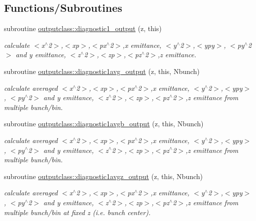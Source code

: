 \subsection*{Functions/\+Subroutines}
\begin{DoxyCompactItemize}
\item 
subroutine \mbox{\hyperlink{namespaceoutputclass_a3b5a43f1652254e5a12880dc332a48c3}{outputclass\+::diagnostic1\+\_\+output}} (z, this)
\begin{DoxyCompactList}\small\item\em calculate $<$x$^\wedge$2$>$,$<$xp$>$,$<$px$^\wedge$2$>$,x emittance, $<$y$^\wedge$2$>$,$<$ypy$>$, $<$py$^\wedge$2$>$ and y emittance, $<$z$^\wedge$2$>$,$<$zp$>$,$<$pz$^\wedge$2$>$,z emittance. \end{DoxyCompactList}\item 
subroutine \mbox{\hyperlink{namespaceoutputclass_ac91c3984014cb5cdc000c0422ccd08a1}{outputclass\+::diagnostic1avg\+\_\+output}} (z, this, Nbunch)
\begin{DoxyCompactList}\small\item\em calculate averaged $<$x$^\wedge$2$>$,$<$xp$>$,$<$px$^\wedge$2$>$,x emittance, $<$y$^\wedge$2$>$,$<$ypy$>$, $<$py$^\wedge$2$>$ and y emittance, $<$z$^\wedge$2$>$,$<$zp$>$,$<$pz$^\wedge$2$>$,z emittance from multiple bunch/bin. \end{DoxyCompactList}\item 
subroutine \mbox{\hyperlink{namespaceoutputclass_a42165712a4636aa78bacdd26efa4bae9}{outputclass\+::diagnostic1avgb\+\_\+output}} (z, this, Nbunch)
\begin{DoxyCompactList}\small\item\em calculate averaged $<$x$^\wedge$2$>$,$<$xp$>$,$<$px$^\wedge$2$>$,x emittance, $<$y$^\wedge$2$>$,$<$ypy$>$, $<$py$^\wedge$2$>$ and y emittance, $<$z$^\wedge$2$>$,$<$zp$>$,$<$pz$^\wedge$2$>$,z emittance from multiple bunch/bin. \end{DoxyCompactList}\item 
subroutine \mbox{\hyperlink{namespaceoutputclass_a4a7e188c45ca9b8099c7715873d9324a}{outputclass\+::diagnostic1avgz\+\_\+output}} (z, this, Nbunch)
\begin{DoxyCompactList}\small\item\em calculate averaged $<$x$^\wedge$2$>$,$<$xp$>$,$<$px$^\wedge$2$>$,x emittance, $<$y$^\wedge$2$>$,$<$ypy$>$, $<$py$^\wedge$2$>$ and y emittance, $<$z$^\wedge$2$>$,$<$zp$>$,$<$pz$^\wedge$2$>$,z emittance from multiple bunch/bin at fixed z (i.\+e. bunch center). \end{DoxyCompactList}\item 

\end{DoxyCompactItemize}
